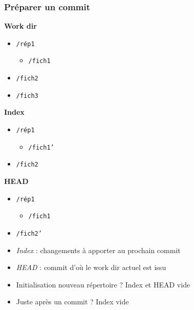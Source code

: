 \documentclass[english, french]{beamer}
\begin{document}
\begin{frame}
	\frametitle{Préparer un commit}
	\begin{minipage}[t]{0.33 \columnwidth}
		\textbf{Work dir}
		\begin{itemize}
			\item[] \texttt{/rép1}
			\begin{itemize}
				\item[] \texttt{/fich1}
			\end{itemize}\vspace{-0.8ex}
			\item[] \texttt{/fich2}
			\item[] \texttt{/fich3}
		\end{itemize}
	\end{minipage}%
	\begin{minipage}[t]{0.33 \columnwidth}
		\textbf{Index}
		\begin{itemize}
			\item[] \texttt{/rép1}
			\begin{itemize}
				\item[] \texttt{/fich1'}
			\end{itemize}\vspace{-0.8ex}
			\item[] \texttt{/fich2}
		\end{itemize}
	\end{minipage}%
	\begin{minipage}[t]{0.33 \columnwidth}
		\textbf{HEAD}
		\begin{itemize}
			\item[] \texttt{/rép1}
			\begin{itemize}
				\item[] \texttt{/fich1}
			\end{itemize}\vspace{-0.8ex}
			\item[] \texttt{/fich2'}
		\end{itemize}
	\end{minipage}
	\begin{itemize}
		\item \emph{Index} : changements à apporter au prochain commit
		\item \emph{HEAD} : commit d’où le work dir actuel est issu
		\item Initialisation nouveau répertoire ? \pause Index et HEAD vide \pause
		\item Juste après un commit ? \pause Index vide
	\end{itemize}
\end{frame}
\end{document}
